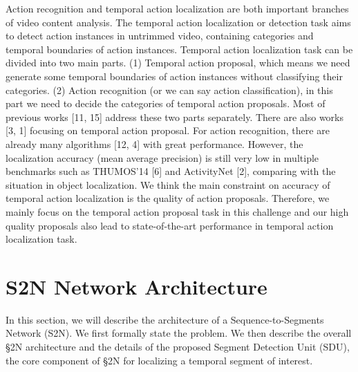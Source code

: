 \documentclass[10pt,journal,compsoc]{IEEEtran}
\begin{document}
Action recognition and temporal action localization are
both important branches of video content analysis. The
temporal action localization or detection task aims to detect
action instances in untrimmed video, containing categories
and temporal boundaries of action instances.
Temporal action localization task can be divided into two
main parts. (1) Temporal action proposal, which means we
need generate some temporal boundaries of action instances
without classifying their categories. (2) Action recognition
(or we can say action classification), in this part we need
to decide the categories of temporal action proposals. Most
of previous works [11, 15] address these two parts separately.
There are also works [3, 1] focusing on temporal
action proposal. For action recognition, there are already
many algorithms [12, 4] with great performance. However,
the localization accuracy (mean average precision) is still
very low in multiple benchmarks such as THUMOS’14 [6]
and ActivityNet [2], comparing with the situation in object
localization. We think the main constraint on accuracy of
temporal action localization is the quality of action proposals.
Therefore, we mainly focus on the temporal action proposal
task in this challenge and our high quality proposals also lead to state-of-the-art performance in temporal action
localization task.



\section{S2N Network Architecture}
In this section, we will describe the architecture of a Sequence-to-Segments Network (S2N). We first formally state the problem.  We then describe the overall \S2N architecture and the details of the proposed Segment Detection Unit (SDU), the core component of \S2N for localizing a temporal segment of interest. 
\end{document}
